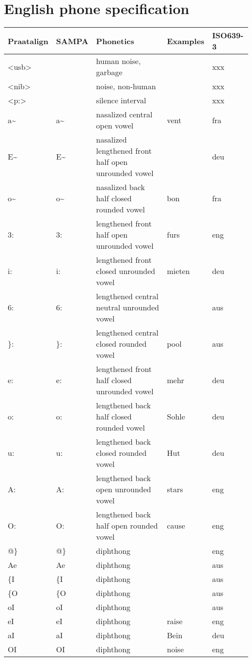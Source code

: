 \section{English phone specification}
\label{sec:slenglish}
\begin{longtable}{llp{}ll}
	Praatalign & SAMPA & Phonetics & Examples & ISO639-3\\
	\hline
	\textless usb\textgreater & & human noise, garbage & & xxx\\
	\textless nib\textgreater & & noise, non-human & & xxx\\
	\textless p:\textgreater & & silence interval & & xxx\\
	a\textasciitilde & a\textasciitilde & nasalized central open vowel & vent & fra\\
	E\textasciitilde & E\textasciitilde & nasalized lengthened front half open unrounded vowel & & deu\\
	o\textasciitilde & o\textasciitilde & nasalized back half closed rounded vowel & bon & fra\\
	3: & 3: & lengthened front half open unrounded vowel & furs & eng\\
	i: & i: & lengthened front closed unrounded vowel & mieten & deu\\
	6: & 6: & lengthened central neutral unrounded vowel & & aus\\
	\}: & \}: & lengthened central closed rounded vowel & pool & aus\\
	e: & e: & lengthened front half closed unrounded vowel & mehr & deu\\
	o: & o: & lengthened back half closed rounded vowel & Sohle & deu\\
	u: & u: & lengthened back closed rounded vowel & Hut & deu\\
	A: & A: & lengthened back open unrounded vowel & stars & eng\\
	O: & O: & lengthened back half open rounded vowel & cause & eng\\
	@\} & @\} & diphthong & & eng\\
	Ae & Ae & diphthong & & aus\\
	\{I & \{I & diphthong & & aus\\
	\{O & \{O & diphthong & & aus\\
	oI & oI & diphthong & & aus\\
	eI & eI & diphthong & raise & eng\\
	aI & aI & diphthong & Bein & deu\\
	OI & OI & diphthong & noise & eng\\

\end{longtable}
